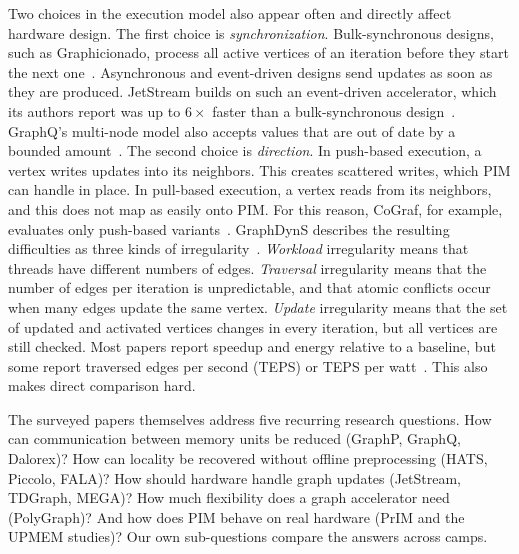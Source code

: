 \documentclass[journal,onecolumn]{IEEEtran}
\begin{document}
Two choices in the execution model also appear often and directly affect hardware design. The first choice is \emph{synchronization}. Bulk-synchronous designs, such as Graphicionado, process all active vertices of an iteration before they start the next one~\cite{ham2016graphicionado}. Asynchronous and event-driven designs send updates as soon as they are produced. JetStream builds on such an event-driven accelerator, which its authors report was up to $6\times$ faster than a bulk-synchronous design~\cite{rahman2021jetstream}. GraphQ's multi-node model also accepts values that are out of date by a bounded amount~\cite{zhuo2019graphq}. The second choice is \emph{direction}. In push-based execution, a vertex writes updates into its neighbors. This creates scattered writes, which PIM can handle in place. In pull-based execution, a vertex reads from its neighbors, and this does not map as easily onto PIM. For this reason, CoGraf, for example, evaluates only push-based variants~\cite{yenimol2026cograf}. GraphDynS describes the resulting difficulties as three kinds of irregularity~\cite{yan2019graphdyns}. \emph{Workload} irregularity means that threads have different numbers of edges. \emph{Traversal} irregularity means that the number of edges per iteration is unpredictable, and that atomic conflicts occur when many edges update the same vertex. \emph{Update} irregularity means that the set of updated and activated vertices changes in every iteration, but all vertices are still checked. Most papers report speedup and energy relative to a baseline, but some report traversed edges per second (TEPS) or TEPS per watt~\cite{lee2022graphwave}. This also makes direct comparison hard.

The surveyed papers themselves address five recurring research questions. How can communication between memory units be reduced (GraphP, GraphQ, Dalorex)? How can locality be recovered without offline preprocessing (HATS, Piccolo, FALA)? How should hardware handle graph updates (JetStream, TDGraph, MEGA)? How much flexibility does a graph accelerator need (PolyGraph)? And how does PIM behave on real hardware (PrIM and the UPMEM studies)? Our own sub-questions compare the answers across camps.
\end{document}
